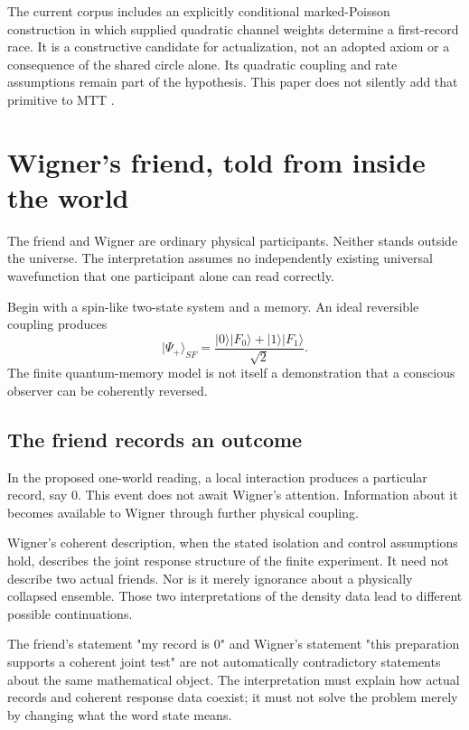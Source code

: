 \documentclass[11pt,a4paper]{article}
\newcommand{\ket}[1]{\lvert #1\rangle}
\begin{document}
The current corpus includes an explicitly conditional marked-Poisson construction in which supplied quadratic channel weights determine a first-record race. It is a constructive candidate for actualization, not an adopted axiom or a consequence of the shared circle alone. Its quadratic coupling and rate assumptions remain part of the hypothesis. This paper does not silently add that primitive to MTT \cite{NeroQM}.

\section{Wigner's friend, told from inside the world}
\label{sec:wigner}
The friend and Wigner are ordinary physical participants. Neither stands outside the universe. The interpretation assumes no independently existing universal wavefunction that one participant alone can read correctly.

Begin with a spin-like two-state system and a memory. An ideal reversible coupling produces
\begin{equation}
\ket{\Psi_+}_{SF}=
\frac{\ket{0}\ket{F_0}+\ket{1}\ket{F_1}}{\sqrt2}.
\label{eq:friend}
\end{equation}
The finite quantum-memory model is not itself a demonstration that a conscious observer can be coherently reversed.

\subsection{The friend records an outcome}
In the proposed one-world reading, a local interaction produces a particular record, say \(0\). This event does not await Wigner's attention. Information about it becomes available to Wigner through further physical coupling.

Wigner's coherent description, when the stated isolation and control assumptions hold, describes the joint response structure of the finite experiment. It need not describe two actual friends. Nor is it merely ignorance about a physically collapsed ensemble. Those two interpretations of the density data lead to different possible continuations.

The friend's statement "my record is 0" and Wigner's statement "this preparation supports a coherent joint test" are not automatically contradictory statements about the same mathematical object. The interpretation must explain how actual records and coherent response data coexist; it must not solve the problem merely by changing what the word state means.
\end{document}
